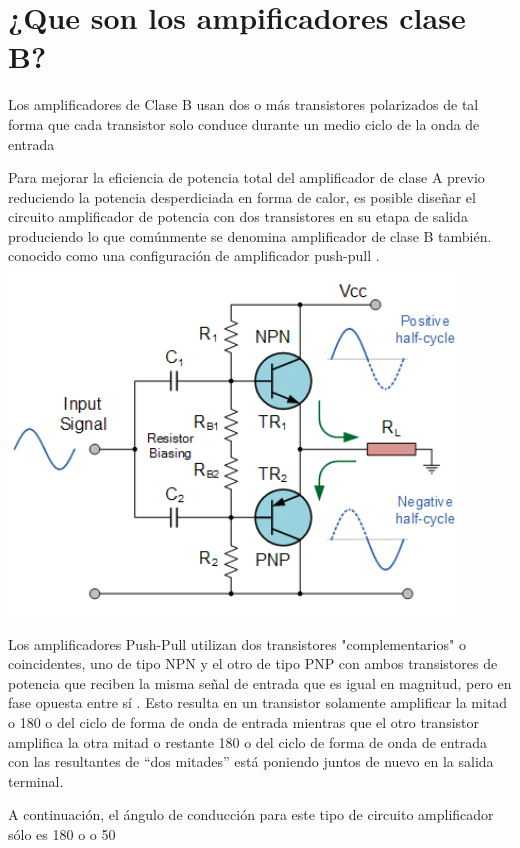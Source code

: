 \documentclass[12pt,a4paper]{article}
\author{leonardo}
\begin{document}
\part{¿Que son los ampificadores clase B?}
\begin{flushleft}
Los amplificadores de Clase B usan dos o más transistores polarizados de tal forma que cada transistor solo conduce durante un medio ciclo de la onda de entrada

Para mejorar la eficiencia de potencia total del amplificador de clase A previo reduciendo la potencia desperdiciada en forma de calor, es posible diseñar el circuito amplificador de potencia con dos transistores en su etapa de salida produciendo lo que comúnmente se denomina amplificador de clase B también. conocido como una configuración de amplificador push-pull .
\includegraphics[weidth=10cm]{1.jpg} 
 
\end{flushleft}
\begin{flushleft}
Los amplificadores Push-Pull utilizan dos transistores "complementarios" o coincidentes, uno de tipo NPN y el otro de tipo PNP con ambos transistores de potencia que reciben la misma señal de entrada que es igual en magnitud, pero en fase opuesta entre sí . Esto resulta en un transistor solamente amplificar la mitad o 180 o del ciclo de forma de onda de entrada mientras que el otro transistor amplifica la otra mitad o restante 180 o del ciclo de forma de onda de entrada con las resultantes de “dos mitades” está poniendo juntos de nuevo en la salida terminal.

A continuación, el ángulo de conducción para este tipo de circuito amplificador sólo es 180 o o 50%

\end{flushleft}
\end{document}
